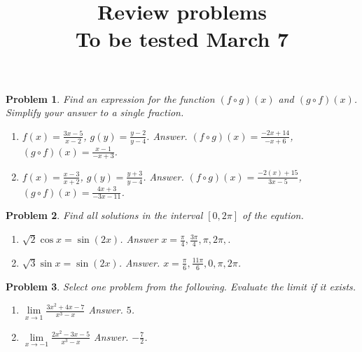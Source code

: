 \documentclass{article}
\date{}
\title{Review problems \\ To be tested March 7}
\newtheorem{problem}{Problem}
\begin{document}
\maketitle
\begin{problem}
Find an expression for the function $(f\circ g)(x)$ and $(g\circ f)(x)$. Simplify your answer to a single fraction. 
\begin{enumerate}
\item $ f(x)= \frac{3x-5}{x-2}$, $g(y)=\frac{y-2 }{y-4} $. Answer. $(f\circ g)(x)=\frac{-2 x+14}{- x+6}$, $(g\circ f)(x)=\frac{x-1}{- x+3}$.
\item $ f(x)= \frac{x-3}{x+2}$, $g(y)=\frac{y+3 }{y-4} $. Answer. $(f\circ g)(x)=\frac{-2 (x)+15}{3 x-5}$, $(g\circ f)(x)=\frac{4 x+3}{-3 x-11}$.
\end{enumerate}
\end{problem}
\begin{problem}
Find all solutions in the interval $[0,2\pi]$ of the eqution.
\begin{enumerate}
\item $\sqrt{2}\cos x = \sin (2x)$. Answer $x=\frac{\pi}{4}, \frac{3\pi}{4},\pi, 2\pi, $.
\item $\sqrt {3} \sin x= \sin (2x)$.  Answer. $x=\frac{\pi}{6}, \frac{11\pi}{6}, 0, \pi, 2\pi $.
\end{enumerate}
\end{problem}
\begin{problem}
Select one problem from the following.
Evaluate the limit if it exists.
\begin{enumerate}
\item $\lim\limits_{x\to 1} \frac{3x^2+4x-7}{x^3-x}$ Answer. $5 $.
\item $\lim\limits_{x\to -1} \frac{2x^2-3x-5}{x^3-x}$ Answer. $ -\frac{7}{2}$.
\end{enumerate}
\end{problem}
\end{document}
